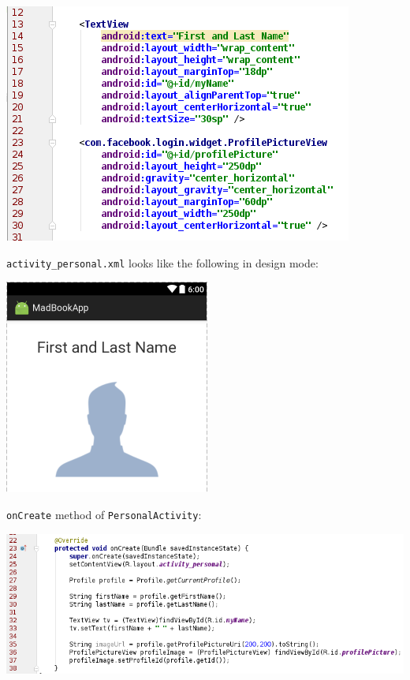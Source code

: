 \begin{center}
	\includegraphics[scale=\SourceCodeScale]{chapters/ch12/images/31}
\end{center}

\texttt{activity\_personal.xml} looks like the following in design mode:

\begin{center}
	\includegraphics[scale=\FigureScale]{chapters/ch12/images/32}
\end{center}

\texttt{onCreate} method of \texttt{PersonalActivity}:

\begin{center}
	\includegraphics[scale=\SourceCodeScale]{chapters/ch12/images/33}
\end{center}


